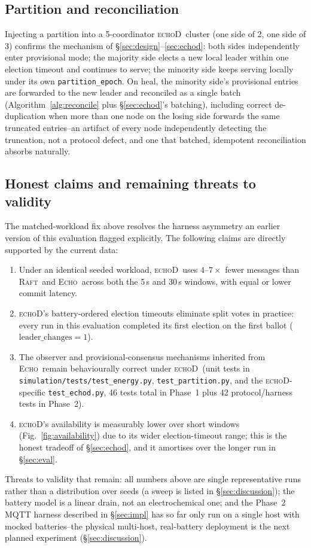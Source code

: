 \documentclass[conference]{IEEEtran}
\newcommand{\echoproto}{\textsc{Echo}\xspace}
\newcommand{\raftproto}{\textsc{Raft}\xspace}
\newcommand{\echodproto}{\textsc{echoD}\xspace}
\begin{document}
\subsection{Partition and reconciliation}
Injecting a partition into a 5-coordinator \echodproto\ cluster (one
side of 2, one side of 3) confirms the mechanism of
\S\ref{sec:design}--\ref{sec:echod}: both sides independently enter
provisional mode; the majority side elects a new local leader within
one election timeout and continues to serve; the minority side keeps
serving locally under its own \texttt{partition\_epoch}. On heal, the
minority side's provisional entries are forwarded to the new leader and
reconciled as a single batch (Algorithm~\ref{alg:reconcile} plus
\S\ref{sec:echod}'s batching), including correct de-duplication when
more than one node on the losing side forwards the same truncated
entries--an artifact of every node independently detecting the
truncation, not a protocol defect, and one that batched, idempotent
reconciliation absorbs naturally.

\subsection{Honest claims and remaining threats to validity}
The matched-workload fix above resolves the harness asymmetry an
earlier version of this evaluation flagged explicitly. The following
claims are directly supported by the current data:
\begin{enumerate}
\item Under an identical seeded workload, \echodproto\ uses
  $4$--$7\times$ fewer messages than \raftproto\ and \echoproto\ across
  both the 5\,s and 30\,s windows, with equal or lower commit latency.
\item \echodproto's battery-ordered election timeouts eliminate split
  votes in practice: every run in this evaluation completed its first
  election on the first ballot ($\text{leader\_changes}{=}1$).
\item The observer and provisional-consensus mechanisms inherited from
  \echoproto\ remain behaviourally correct under \echodproto\ (unit
  tests in \texttt{simulation/tests/test\_energy.py},
  \texttt{test\_partition.py}, and the \echodproto-specific
  \texttt{test\_echod.py}, 46 tests total in Phase~1 plus 42
  protocol/harness tests in Phase~2).
\item \echodproto's availability is measurably lower over short windows
  (Fig.~\ref{fig:availability}) due to its wider election-timeout
  range; this is the honest tradeoff of \S\ref{sec:echod}, and it
  amortises over the longer run in \S\ref{sec:eval}.
\end{enumerate}
Threats to validity that remain: all numbers above are single
representative runs rather than a distribution over seeds (a sweep is
listed in \S\ref{sec:discussion}); the battery model is a linear drain,
not an electrochemical one; and the Phase~2 MQTT harness described in
\S\ref{sec:impl} has so far only run on a single host with mocked
batteries--the physical multi-host, real-battery deployment is the
next planned experiment (\S\ref{sec:discussion}).
\end{document}
